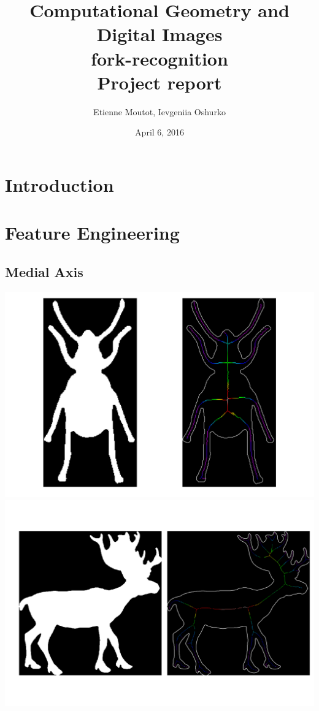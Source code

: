 \documentclass{article}
\begin{document}
\title{
Computational Geometry and Digital Images \\
fork-recognition\\
Project report
}

\author{Etienne Moutot, Ievgeniia Oshurko}
\date{April 6, 2016}
\maketitle


\section{Introduction}  

\section{Feature Engineering}
\subsection{Medial Axis}

\includegraphics[scale=0.25]{beetle_281.png}
\includegraphics[scale=0.25]{deer_79.png}
\end{document}
